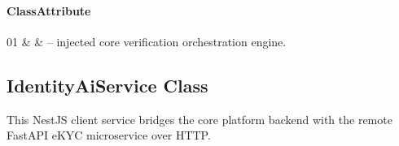 \paragraph{ClassAttribute}
\begin{ClassAttributeTable}
01 &  &  -- injected core verification orchestration engine. \\ \hline
\end{ClassAttributeTable}


\subsection{IdentityAiService Class}
\label{cls:kvy-IdentityAiService}

This NestJS client service bridges the core platform backend with the remote FastAPI eKYC microservice over HTTP.

